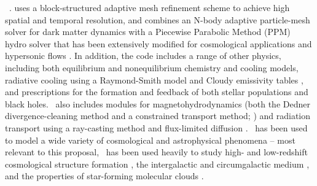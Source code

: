 \enzo\
\cite[][\url{http://enzo-project.org}]{2014ApJS..211...19B}.  
uses a block-structured adaptive mesh refinement scheme 
\cite{Berger89} to achieve high spatial and temporal resolution, and
combines an N-body adaptive particle-mesh solver for dark matter
dynamics with a Piecewise Parabolic Method (PPM) hydro solver that has
been extensively 
modified for cosmological applications and hypersonic
flows \cite{Bryan95}.  In addition, the code includes a range of other
physics, including both equilibrium and nonequilibrium chemistry and
cooling models, radiative cooling using a Raymond-Smith model and
Cloudy emissivity tables \cite{2008MNRAS.385.1443S}, and prescriptions
for the formation and feedback of both stellar populations and black
holes.  \enzo\ also includes modules for magnetohydrodynamics (both
the Dedner divergence-cleaning method and a constrained transport
method; \cite{Wang:2009a,Wang:2010,Collins10}) and radiation transport
using a ray-casting method and flux-limited diffusion \cite{Wise11,
Reynolds09}.  \enzo\ has been used to model a wide variety of
cosmological and astrophysical phenomena -- most relevant to this
proposal, \enzo\ has been used heavily to study high- and
low-redshift cosmological structure formation \cite{Abel02, Turk09,
2007ApJ...654...66O, 2012MNRAS.427..311W, 2008MNRAS.385.1443S,
2012ApJ...749..140H, 2014ApJ...791...64E, 2013MNRAS.432.1989S}, the
intergalactic and circumgalactic medium
\cite{2007ApJ...671...27H,2011ApJ...731....6S,2013MNRAS.430.1548H,2012ApJ...759..137J},
and the properties of star-forming molecular clouds
\cite{Kritsuk11,Kritsuk11b,Collins11,Collins11b,Collins12,Schmidt13}.



